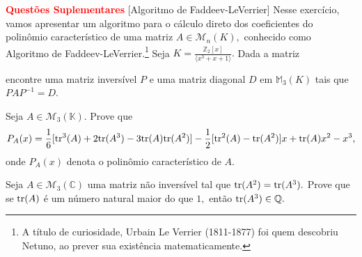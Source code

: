 \documentclass[11pt,a4paper]{article}
\begin{document}

\bigskip
\noindent
\textbf{\textcolor{Red}{Questões Suplementares}}
 [Algoritmo de Faddeev-LeVerrier] Nesse exercício, vamos apresentar um algoritmo para o cálculo direto dos coeficientes do polinômio característico de uma matriz $A \in \mathcal{M}_n(K),$ conhecido como Algoritmo de Faddeev-LeVerrier.\footnote{A título de curiosidade, Urbain Le Verrier (1811-1877) foi quem descobriu Netuno, ao prever sua existência matematicamente.}
\solucao{}
 Seja $K = \frac{\mathbb{Z}_2[x]}{\langle x^3 + x + 1 \rangle}.$ Dada a matriz

encontre uma matriz inversível $P$ e uma matriz diagonal $D$ em $\mathbb{M}_3(K)$ tais que $PAP^{-1} = D.$

\solucao{}

 Seja $A \in \mathcal{M}_3(\mathbb{K}).$ Prove que
\[
P_A(x)=\frac{1}{6}[\mathrm{tr }^3(A)+2\mathrm{tr }(A^3)-3\mathrm{tr }(A)\mathrm{tr }(A^2)]-\frac{1}{2}[\mathrm{tr }^2(A)-\mathrm{tr }(A^2)]x+\mathrm{tr }(A)x^2-x^3,
\]
onde $P_A(x)$ denota o polinômio característico de $A.$
\solucao{}

 Seja $A \in \mathcal{M}_3(\mathbb{C})$ uma matriz não inversível tal que $\mathrm{tr }(A^2) = \mathrm{tr }(A^3).$ Prove que se $\mathrm{tr }(A)$ é um número natural maior do que $1,$ então $\mathrm{tr }(A^3) \in \mathbb{Q}.$
\solucao{}
\end{document}
